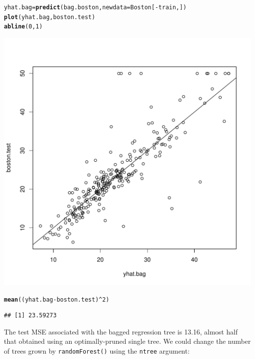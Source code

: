 \documentclass[12pt]{article}\usepackage[]{graphicx}\usepackage[]{color}
\makeatletter
\def\maxwidth{ %
  \ifdim\Gin@nat@width>\linewidth
    \linewidth
  \else
    \Gin@nat@width
  \fi
}
\newcommand{\hlnum}[1]{\textcolor[rgb]{0.686,0.059,0.569}{#1}}%
\newcommand{\hlopt}[1]{\textcolor[rgb]{0,0,0}{#1}}%
\newcommand{\hlstd}[1]{\textcolor[rgb]{0.345,0.345,0.345}{#1}}%
\newcommand{\hlkwb}[1]{\textcolor[rgb]{0.69,0.353,0.396}{#1}}%
\newcommand{\hlkwc}[1]{\textcolor[rgb]{0.333,0.667,0.333}{#1}}%
\newcommand{\hlkwd}[1]{\textcolor[rgb]{0.737,0.353,0.396}{\textbf{#1}}}%
\newenvironment{kframe}{%
 \def\at@end@of@kframe{}%
 \ifinner\ifhmode%
  \def\at@end@of@kframe{\end{minipage}}%
  \begin{minipage}{\columnwidth}%
 \fi\fi%
 \def\FrameCommand##1{\hskip\@totalleftmargin \hskip-\fboxsep
 \colorbox{shadecolor}{##1}\hskip-\fboxsep
     \hskip-\linewidth \hskip-\@totalleftmargin \hskip\columnwidth}%
 \MakeFramed {\advance\hsize-\width
   \@totalleftmargin\z@ \linewidth\hsize
   \@setminipage}}%
 {\par\unskip\endMakeFramed%
 \at@end@of@kframe}
\newenvironment{knitrout}{}{} %
\makeatother
\begin{document}
\begin{knitrout}
\color{fgcolor}\begin{kframe}
\begin{alltt}
\hlstd{yhat.bag} \hlkwb{=} \hlkwd{predict}\hlstd{(bag.boston,} \hlkwc{newdata}\hlstd{=Boston[}\hlopt{-}\hlstd{train,])}
\hlkwd{plot}\hlstd{(yhat.bag, boston.test)}
\hlkwd{abline}\hlstd{(}\hlnum{0}\hlstd{,}\hlnum{1}\hlstd{)}
\end{alltt}
\end{kframe}
\includegraphics[width=\maxwidth]{figure/unnamed-chunk-19-1} 
\begin{kframe}\begin{alltt}
\hlkwd{mean}\hlstd{((yhat.bag}\hlopt{-}\hlstd{boston.test)}\hlopt{^}\hlnum{2}\hlstd{)}
\end{alltt}
\begin{verbatim}
## [1] 23.59273
\end{verbatim}
\end{kframe}
\end{knitrout}

The test MSE associated with the bagged regression tree is 13.16, almost half that obtained using an optimally-pruned single tree. We could change the number of trees grown by \texttt{randomForest()} using the \texttt{ntree} argument:
\end{document}
